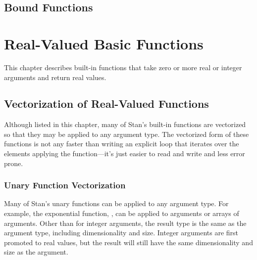 \section{Bound Functions}
%
\begin{description}
\end{description}


\chapter{Real-Valued Basic Functions}

\noindent
This chapter describes built-in functions that take zero or more real
or integer arguments and return real values.  

\section{Vectorization of Real-Valued Functions}\label{fun-vectorization.section}

Although listed in this chapter, many of Stan's built-in functions are
vectorized so that they may be applied to any argument type.  The
vectorized form of these functions is not any faster than writing an
explicit loop that iterates over the elements applying the
function---it's just easier to read and write and less error prone.

\subsection{Unary Function Vectorization}

Many of Stan's unary functions can be applied to any argument type.
For example, the exponential function, , can be applied to
 arguments or arrays of  arguments.  Other than
for integer arguments, the result type is the same as the argument
type, including dimensionality and size.  Integer arguments are first
promoted to real values, but the result will still have the same
dimensionality and size as the argument.

